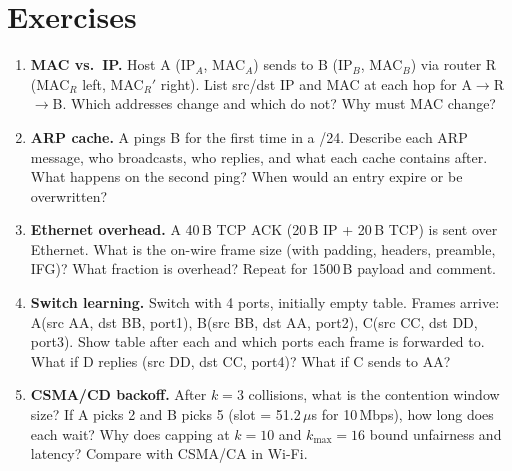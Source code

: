 \section{Exercises}\label{sec:ch06-exercises}
\begin{enumerate}[label=E6.\arabic*, leftmargin=*, itemsep=0.7em]
    \item \textbf{MAC vs.\ IP.} Host A (IP$_A$, MAC$_A$) sends to B (IP$_B$, MAC$_B$) via router R (MAC$_R$ left, MAC$_R'$ right). List src/dst IP and MAC at each hop for A$\to$R$\to$B. Which addresses change and which do not? Why must MAC change?
    \item \textbf{ARP cache.} A pings B for the first time in a /24. Describe each ARP message, who broadcasts, who replies, and what each cache contains after. What happens on the second ping? When would an entry expire or be overwritten?
    \item \textbf{Ethernet overhead.} A 40\,B TCP ACK (20\,B IP + 20\,B TCP) is sent over Ethernet. What is the on-wire frame size (with padding, headers, preamble, IFG)? What fraction is overhead? Repeat for 1500\,B payload and comment.
    \item \textbf{Switch learning.} Switch with 4 ports, initially empty table. Frames arrive: A(src AA, dst BB, port1), B(src BB, dst AA, port2), C(src CC, dst DD, port3). Show table after each and which ports each frame is forwarded to. What if D replies (src DD, dst CC, port4)? What if C sends to AA?
    \item \textbf{CSMA/CD backoff.} After $k=3$ collisions, what is the contention window size? If A picks 2 and B picks 5 (slot = 51.2\,$\mu$s for 10\,Mbps), how long does each wait? Why does capping at $k=10$ and $k_{\max}=16$ bound unfairness and latency? Compare with CSMA/CA in Wi-Fi.
\end{enumerate}
